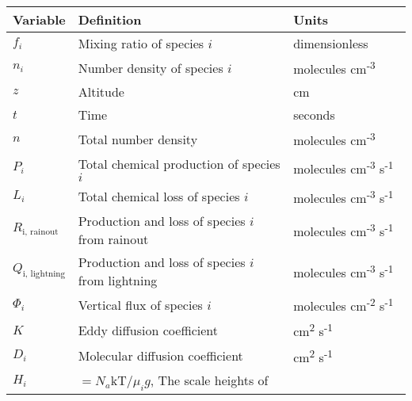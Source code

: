 \documentclass{article}
\begin{document}




\begin{table}
\centering
\begin{tabularx}{\linewidth}{p{0.15\linewidth} | p{0.55\linewidth} | p{0.3\linewidth}}
\hline \hline
Variable & Definition & Units \\
\hline
\(f_{i}\) & Mixing ratio of species \(i\) & dimensionless \\
\(n_{i}\) & Number density of species \(i\) & molecules
cm\textsuperscript{-3} \\
\(z\) & Altitude & cm \\
\(t\) & Time & seconds \\
\(n\) & Total number density & molecules
cm\textsuperscript{-3} \\
\(P_{i}\) & Total chemical production of species \(i\) & molecules
cm\textsuperscript{-3} s\textsuperscript{-1} \\
\(L_{i}\) & Total chemical loss of species \(i\) & molecules
cm\textsuperscript{-3} s\textsuperscript{-1} \\
\(R_{\text{i, rainout}}\) & Production and loss of species \(i\) from
rainout & molecules cm\textsuperscript{-3}
s\textsuperscript{-1} \\
\(Q_{\text{i, lightning}}\) & Production and loss of species \(i\)
from lightning & molecules cm\textsuperscript{-3}
s\textsuperscript{-1} \\
\(\Phi_{i}\) & Vertical flux of species \(i\) & molecules
cm\textsuperscript{-2} s\textsuperscript{-1} \\
\(K\) & Eddy diffusion coefficient & cm\textsuperscript{2}
s\textsuperscript{-1} \\
\(D_{i}\) & Molecular diffusion coefficient & cm\textsuperscript{2}
s\textsuperscript{-1} \\
\(H_{i}\) & \(= N_{a}\text{kT}\text{/}\mu_{i}g\), The scale heights of

\end{tabularx}
\end{table}
\end{document}
